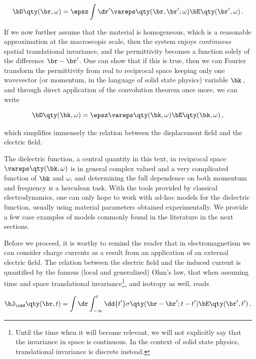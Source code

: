 \begin{equation}
    \bD\qty(\br,\omega) = \epsz \int \dr' \vareps\qty(\br, \br'; \omega) \bE\qty(\br',\omega)\,.
\end{equation}

\noindent If we now further assume that the material is homogeneous, which is a reasonable approximation at the macroscopic scale, then the system enjoys \textit{continuous} spatial translational invariance, and the permittivity becomes a function solely of the difference $\br-\br'$.
One can show that if this is true, then we can Fourier transform the permittivity from real to reciprocal space keeping only one wavevector (or momentum, in the language of solid state physics) variable $\bk$\,, and through direct application of the convolution theorem once more, we can write

\begin{equation}
    \bD\qty(\bk,\omega) = \epsz \vareps\qty(\bk, \omega) \bE\qty(\bk,\omega)\,,
\end{equation}

\noindent which simplifies immensely the relation between the displacement field and the electric field.

The dielectric function, a central quantity in this text, in reciprocal space $\vareps\qty(\bk,\omega)$ is in general complex valued and a very complicated function of $\bk$ and $\omega$, and determining the full dependence on both momentum and frequency is a herculean task.
With the tools provided by classical electrodynamics, one can only hope to work with ad-hoc models for the dielectric function, usually using material parameters obtained experimentally.
We provide a few case examples of models commonly found in the literature in the next sections.

Before we proceed, it is worthy to remind the reader that in electromagnetism we can consider charge currents as a result from an application of an external electric field.
The relation between the electric field and the induced current is quantified by the famous (local and generalized) Ohm's law, that when assuming time and space translational invariance\footnote{Until the time when it will become relevant, we will not explicitly say that the invariance in space is continuous. In the context of solid state physics, translational invariance is discrete instead.}, and isotropy as well, reads

\begin{equation}
    \bJ_\ind\qty(\br,t) = \int \dr \int_{-\infty}^t \dd{t'} \sigma\qty(\br - \br'; t - t') \bE\qty(\br',t')\,,
\end{equation}

